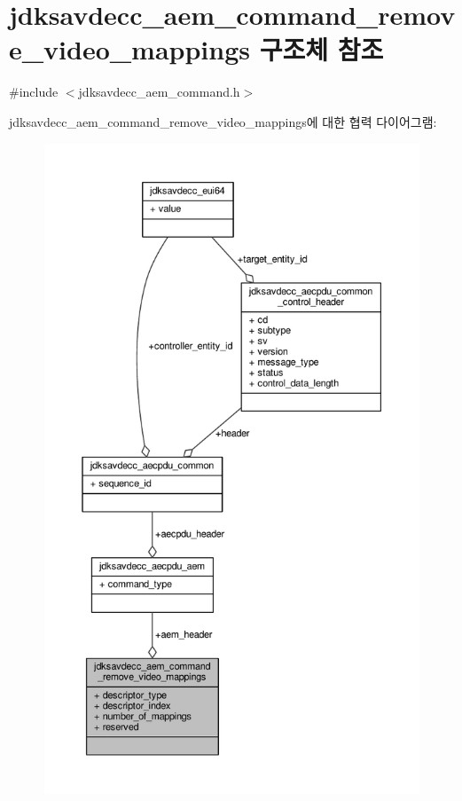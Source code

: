 \hypertarget{structjdksavdecc__aem__command__remove__video__mappings}{}\section{jdksavdecc\+\_\+aem\+\_\+command\+\_\+remove\+\_\+video\+\_\+mappings 구조체 참조}
\label{structjdksavdecc__aem__command__remove__video__mappings}


{\ttfamily \#include $<$jdksavdecc\+\_\+aem\+\_\+command.\+h$>$}



jdksavdecc\+\_\+aem\+\_\+command\+\_\+remove\+\_\+video\+\_\+mappings에 대한 협력 다이어그램\+:
\nopagebreak
\begin{figure}[H]
\begin{center}
\leavevmode
\includegraphics[height=550pt]{structjdksavdecc__aem__command__remove__video__mappings__coll__graph}
\end{center}
\end{figure}
